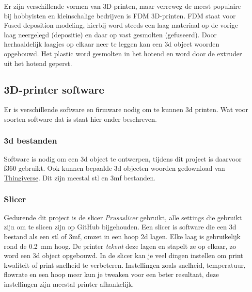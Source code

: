 Er zijn verschillende vormen van 3D-printen, maar verreweg de meest populaire
bij hobbyisten en kleinschalige bedrijven is FDM 3D-printen. FDM staat voor
Fused deposition modeling, hierbij word steeds een laag materiaal op de vorige
laag neergelegd (depositie) en daar op vast gesmolten (gefuseerd). Door
herhaaldelijk laagjes op elkaar neer te leggen kan een \ac{3d} object woorden
opgebouwd. Het plastic word gesmolten in het hotend en word door de extruder
uit het hotend geperst.

\subsection{3D-printer software}

Er is verschillende software en firmware nodig om te kunnen 3d printen. Wat
voor soorten software dat is staat hier onder beschreven.

\subsubsection{\ac{3d} bestanden}

Software is nodig om een 3d object te ontwerpen, tijdens dit project is
daarvoor \ac{f360} gebruikt. Ook kunnen bepaalde \ac{3d} objecten woorden
gedownload van \href{https://www.thingiverse.com}{Thingiverse}. Dit zijn
meestal \ac{stl} en \ac{3mf} bestanden.

\subsubsection{Slicer}

Gedurende dit project is de slicer \emph{Prusaslicer} gebruikt, alle settings
die gebruikt zijn om te slicen zijn op GitHub bijgehouden.  Een slicer is
software die een \ac{3d} bestand als een \ac{stl} of \ac{3mf}, omzet in een
hoop \ac{2d} lagen. Elke laag is gebruikelijk rond de \SI{0.2}{\milli\meter}
hoog. De printer \emph{tekent} deze lagen en stapelt ze op elkaar, zo word een
\ac{3d} object opgebouwd. In de slicer kan je veel dingen instellen om print
kwaliteit of print snelheid te verbeteren. Instellingen zoals snelheid,
temperatuur, flowrate en een hoop meer kun je tweaken voor een beter resultaat,
deze instellingen zijn meestal printer afhankelijk.

